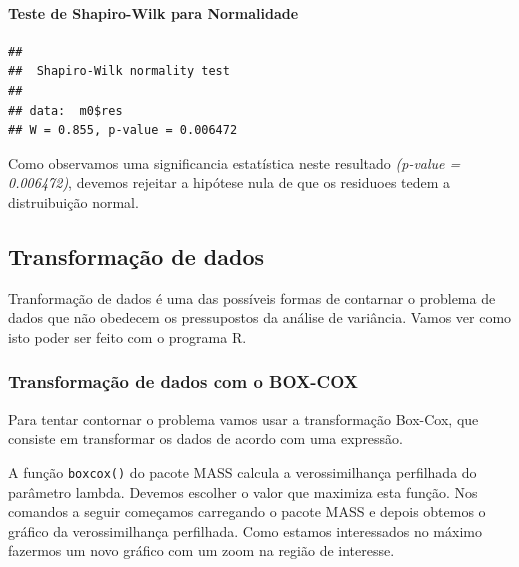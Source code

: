 \documentclass[
]{book}
\newenvironment{Shaded}{\begin{snugshade}}{\end{snugshade}}
\newcommand{\KeywordTok}[1]{\textcolor[rgb]{0.13,0.29,0.53}{\textbf{#1}}}
\newcommand{\NormalTok}[1]{#1}
\newcommand{\OperatorTok}[1]{\textcolor[rgb]{0.81,0.36,0.00}{\textbf{#1}}}
\begin{document}
\hypertarget{teste-de-shapiro-wilk-para-normalidade}{%
\paragraph{Teste de Shapiro-Wilk para Normalidade}\label{teste-de-shapiro-wilk-para-normalidade}}

\begin{Shaded}
\end{Shaded}

\begin{verbatim}
## 
##  Shapiro-Wilk normality test
## 
## data:  m0$res
## W = 0.855, p-value = 0.006472
\end{verbatim}

Como observamos uma significancia estatística neste resultado \emph{(p-value = 0.006472)}, devemos rejeitar a hipótese nula de que os residuoes tedem a distruibuição normal.

\hypertarget{transformauxe7uxe3o-de-dados}{%
\subsection{Transformação de dados}\label{transformauxe7uxe3o-de-dados}}

Tranformação de dados é uma das possíveis formas de contarnar o problema de dados que não obedecem os pressupostos da análise de variância. Vamos ver como isto poder ser feito com o programa R.

\hypertarget{transformauxe7uxe3o-de-dados-com-o-box-cox}{%
\subsubsection{Transformação de dados com o BOX-COX}\label{transformauxe7uxe3o-de-dados-com-o-box-cox}}

Para tentar contornar o problema vamos usar a transformação Box-Cox, que consiste em transformar os dados de acordo com uma expressão.

A função \texttt{boxcox()} do pacote MASS calcula a verossimilhança perfilhada do parâmetro lambda. Devemos escolher o valor que maximiza esta função. Nos comandos a seguir começamos carregando o pacote MASS e depois obtemos o gráfico da verossimilhança perfilhada. Como estamos interessados no máximo fazermos um novo gráfico com um zoom na região de interesse.
\end{document}
